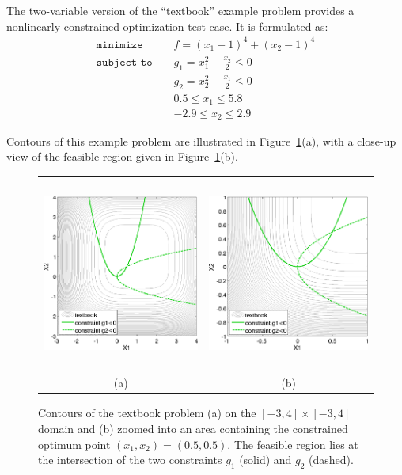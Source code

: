 The two-variable version of the ``textbook'' example problem provides
a nonlinearly constrained optimization test case. It is formulated as:
\begin{eqnarray}
\texttt{minimize }
& & f = (x_1-1)^{4}+(x_2-1)^{4}     \nonumber \\
\texttt{subject to }
& & g_1 = x_1^2-\frac{x_2}{2} \le 0 \nonumber \\
& & g_2 = x_2^2-\frac{x_1}{2} \le 0 \label{tutorial:textbook_f} \\
& &  0.5 \le x_1 \le 5.8            \nonumber \\
& & -2.9 \le x_2 \le 2.9            \nonumber
\end{eqnarray}

Contours of this example problem are illustrated in
Figure~\ref{tutorial:textbook_prob}(a), with a close-up view of
the feasible region given in
Figure~\ref{tutorial:textbook_prob}(b).

\begin{figure}[htp!]
  \centering
  \begin{tabular}{cc}
  \includegraphics[height=2.5in]{images/textbook_contours} &
  \includegraphics[height=2.5in]{images/textbook_closeup} \\
  (a) & (b) \\
  \end{tabular}
  \caption{Contours of the textbook problem (a) on the $[-3,4] \times
    [-3,4]$ domain and (b) zoomed into an area containing the
    constrained optimum point $(x_1,x_2) = (0.5,0.5)$. The
    feasible region lies at the intersection of the two constraints
    $g_1$ (solid) and $g_2$ (dashed).}
  \label{tutorial:textbook_prob}
\end{figure}

